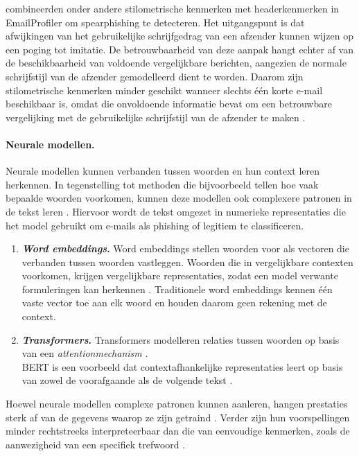 \textcite{Duman2016} combineerden onder andere stilometrische kenmerken met headerkenmerken in EmailProfiler om spearphishing te detecteren. Het uitgangspunt is dat afwijkingen van het gebruikelijke schrijfgedrag van een afzender kunnen wijzen op een poging tot imitatie. De betrouwbaarheid van deze aanpak hangt echter af van de beschikbaarheid van voldoende vergelijkbare berichten, aangezien de normale schrijfstijl van de afzender gemodelleerd dient te worden. Daarom zijn stilometrische kenmerken minder geschikt wanneer slechts één korte e-mail beschikbaar is, omdat die onvoldoende informatie bevat om een betrouwbare vergelijking met de gebruikelijke schrijfstijl van de afzender te maken \autocite{Stringhini2014}.

\paragraph{Neurale modellen.}
Neurale modellen kunnen verbanden tussen woorden en hun context leren herkennen. In tegenstelling tot methoden die bijvoorbeeld tellen hoe vaak bepaalde woorden voorkomen, kunnen deze modellen ook complexere patronen in de tekst leren \autocite{Salloum2022}. Hiervoor wordt de tekst omgezet in numerieke representaties die het model gebruikt om e-mails als phishing of legitiem te classificeren.

\begin{enumerate}
    \item \textbf{\emph{Word embeddings}.} Word embeddings stellen woorden voor als vectoren die verbanden tussen woorden vastleggen. Woorden die in vergelijkbare contexten voorkomen, krijgen vergelijkbare representaties, zodat een model verwante formuleringen kan herkennen \autocite{Salloum2022}. Traditionele word embeddings kennen één vaste vector toe aan elk woord en houden daarom geen rekening met de context.
    \item \textbf{\emph{Transformers}.} Transformers modelleren relaties tussen woorden op basis van een \emph{attentionmechanism} \autocite{Vaswani2017}.\\ BERT is een voorbeeld dat contextafhankelijke representaties leert op basis van zowel de voorafgaande als de volgende tekst \autocite{Devlin2019}.
\end{enumerate}

Hoewel neurale modellen complexe patronen kunnen aanleren, hangen prestaties sterk af van de gegevens waarop ze zijn getraind \autocite{Hammoudeh2024}. Verder zijn hun voorspellingen minder rechtstreeks interpreteerbaar dan die van eenvoudige kenmerken, zoals de aanwezigheid van een specifiek trefwoord \autocite{Rudin2019}.

